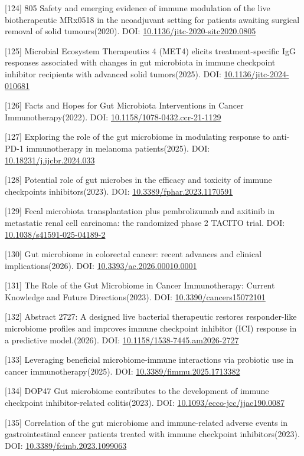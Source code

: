 {[}124{]} 805 Safety and emerging evidence of immune modulation of the live biotherapeutic MRx0518 in the neoadjuvant setting for patients awaiting surgical removal of solid tumours(2020). DOI: \url{10.1136/jitc-2020-sitc2020.0805}

{[}125{]} Microbial Ecosystem Therapeutics 4 (MET4) elicits treatment-specific IgG responses associated with changes in gut microbiota in immune checkpoint inhibitor recipients with advanced solid tumors(2025). DOI: \url{10.1136/jitc-2024-010681}

{[}126{]} Facts and Hopes for Gut Microbiota Interventions in Cancer Immunotherapy(2022). DOI: \url{10.1158/1078-0432.ccr-21-1129}

{[}127{]} Exploring the role of the gut microbiome in modulating response to anti-PD-1 immunotherapy in melanoma patients(2025). DOI: \url{10.18231/j.ijcbr.2024.033}

{[}128{]} Potential role of gut microbes in the efficacy and toxicity of immune checkpoints inhibitors(2023). DOI: \url{10.3389/fphar.2023.1170591}

{[}129{]} Fecal microbiota transplantation plus pembrolizumab and axitinib in metastatic renal cell carcinoma: the randomized phase 2 TACITO trial. DOI: \url{10.1038/s41591-025-04189-2}

{[}130{]} Gut microbiome in colorectal cancer: recent advances and clinical implications(2026). DOI: \url{10.3393/ac.2026.00010.0001}

{[}131{]} The Role of the Gut Microbiome in Cancer Immunotherapy: Current Knowledge and Future Directions(2023). DOI: \url{10.3390/cancers15072101}

{[}132{]} Abstract 2727: A designed live bacterial therapeutic restores responder-like microbiome profiles and improves immune checkpoint inhibitor (ICI) response in a predictive model.(2026). DOI: \url{10.1158/1538-7445.am2026-2727}

{[}133{]} Leveraging beneficial microbiome-immune interactions via probiotic use in cancer immunotherapy(2025). DOI: \url{10.3389/fimmu.2025.1713382}

{[}134{]} DOP47 Gut microbiome contributes to the development of immune checkpoint inhibitor-related colitis(2023). DOI: \url{10.1093/ecco-jcc/jjac190.0087}

{[}135{]} Correlation of the gut microbiome and immune-related adverse events in gastrointestinal cancer patients treated with immune checkpoint inhibitors(2023). DOI: \url{10.3389/fcimb.2023.1099063}

